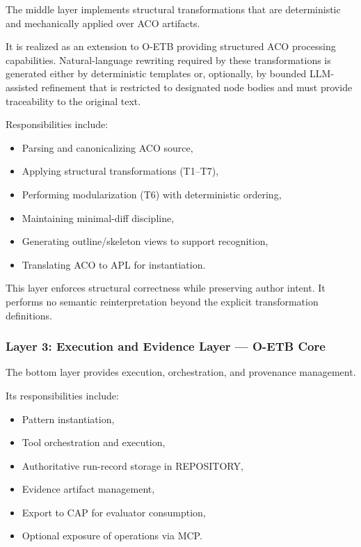 \documentclass[12pt,twoside,a4paper]{article}
\begin{document}
The middle layer implements structural transformations that are deterministic and mechanically applied over ACO artifacts.

It is realized as an extension to O-ETB providing structured ACO processing capabilities.
Natural-language rewriting required by these transformations is generated either by deterministic templates or, optionally, by bounded LLM-assisted refinement that is restricted to designated node bodies and must provide traceability to the original text.

Responsibilities include:

\begin{itemize}
  \item Parsing and canonicalizing ACO source,
  \item Applying structural transformations (T1--T7),
  \item Performing modularization (T6) with deterministic ordering,
  \item Maintaining minimal-diff discipline,
  \item Generating outline/skeleton views to support recognition,
  \item Translating ACO to APL for instantiation.
\end{itemize}

This layer enforces structural correctness while preserving author intent. It performs no semantic reinterpretation beyond the explicit transformation definitions.

\subsubsection{Layer 3: Execution and Evidence Layer --- O-ETB Core}

The bottom layer provides execution, orchestration, and provenance management.

Its responsibilities include:

\begin{itemize}
  \item Pattern instantiation,
  \item Tool orchestration and execution,
  \item Authoritative run-record storage in REPOSITORY,
  \item Evidence artifact management,
  \item Export to CAP for evaluator consumption,
  \item Optional exposure of operations via MCP.
\end{itemize}
\end{document}
